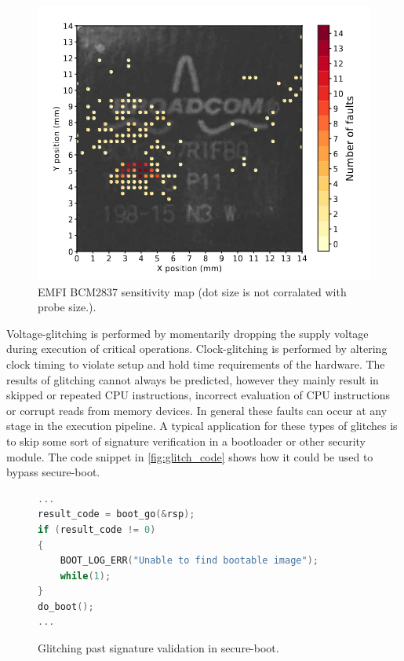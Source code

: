 \begin{figure}[h!]
    \centering
    \includegraphics[scale=0.5]{docs/images/emfi_error_map.png}
    \caption{EMFI BCM2837 sensitivity map (dot size is not corralated with probe size.)\cite{emfi_injection}.}
    \label{fig:emfi_map}
\end{figure}

Voltage-glitching is performed by momentarily dropping the supply voltage during execution of critical operations. Clock-glitching is performed by altering clock timing to violate setup and hold time requirements of the hardware\cite{intro_to_FI}. The results of glitching cannot always be predicted, however they mainly result in skipped or repeated CPU instructions, incorrect evaluation of CPU instructions or corrupt reads from memory devices\cite{intro_to_FI}. In general these faults can occur at any stage in the execution pipeline. A typical application for these types of glitches is to skip some sort of signature verification in a bootloader or other security module. The code snippet in \autoref{fig:glitch_code} shows how it could be used to bypass secure-boot.

\begin{figure}
\begin{lstlisting}[language=C]
...
result_code = boot_go(&rsp);
if (result_code != 0)
{
    BOOT_LOG_ERR("Unable to find bootable image");
    while(1);
}
do_boot();
...
\end{lstlisting}
\caption{Glitching past signature validation in secure-boot.}
\label{fig:glitch_code}
\end{figure}


